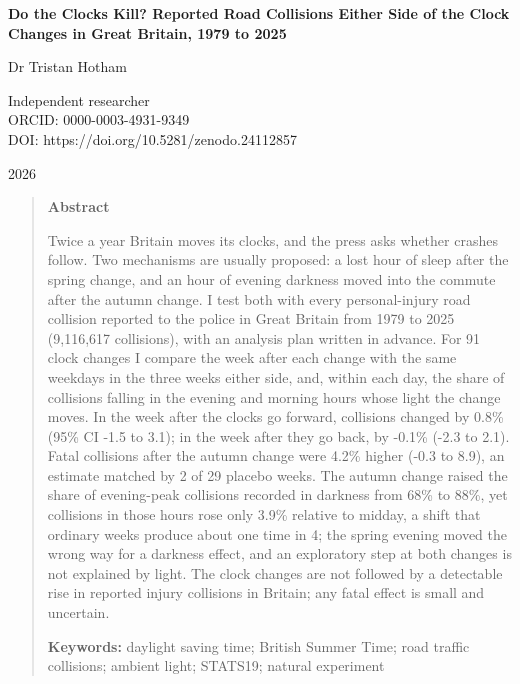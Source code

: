 \documentclass[11pt,a4paper]{article}
\begin{document}
\begin{center}
{\Large\bfseries Do the Clocks Kill? Reported Road Collisions Either Side of the Clock Changes in Great Britain, 1979 to 2025\par}
\vspace{1.2em}
{\large Dr Tristan Hotham\par}
\vspace{0.3em}
{\small Independent researcher\\
ORCID: 0000-0003-4931-9349\\
DOI: https://doi.org/10.5281/zenodo.24112857\par}
\vspace{0.8em}
2026
\end{center}

\begin{quote}
\small
\begin{center}\textbf{Abstract}\end{center}
Twice a year Britain moves its clocks, and the press asks whether crashes follow. Two mechanisms are usually proposed: a lost hour of sleep after the spring change, and an hour of evening darkness moved into the commute after the autumn change. I test both with every personal-injury road collision reported to the police in Great Britain from 1979 to 2025 (9,116,617 collisions), with an analysis plan written in advance. For 91 clock changes I compare the week after each change with the same weekdays in the three weeks either side, and, within each day, the share of collisions falling in the evening and morning hours whose light the change moves. In the week after the clocks go forward, collisions changed by 0.8\% (95\% CI -1.5 to 3.1); in the week after they go back, by -0.1\% (-2.3 to 2.1). Fatal collisions after the autumn change were 4.2\% higher (-0.3 to 8.9), an estimate matched by 2 of 29 placebo weeks. The autumn change raised the share of evening-peak collisions recorded in darkness from 68\% to 88\%, yet collisions in those hours rose only 3.9\% relative to midday, a shift that ordinary weeks produce about one time in 4; the spring evening moved the wrong way for a darkness effect, and an exploratory step at both changes is not explained by light. The clock changes are not followed by a detectable rise in reported injury collisions in Britain; any fatal effect is small and uncertain.

\textbf{Keywords:} daylight saving time; British Summer Time; road traffic collisions; ambient light; STATS19; natural experiment
\end{quote}
\end{document}
